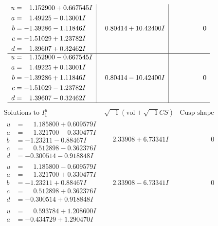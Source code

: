 \documentclass[1p]{elsarticle_modified}
\theoremstyle{definition}
\newcommand{\I}{\sqrt{-1}}
\begin{document}
$$\begin{array}{c|c|c}
\begin{aligned}
u &= \phantom{-}1.152900 + 0.667545 I \\
a &= \phantom{-}1.49225 - 0.13001 I \\
b &= -1.39286 - 1.11846 I \\
c &= -1.51029 + 1.23782 I \\
d &= \phantom{-}1.39607 + 0.32462 I\end{aligned}
 & \phantom{-}0.80414 + 10.42400 I & \phantom{-0.000000 } 0 \\ \hline\begin{aligned}
u &= \phantom{-}1.152900 - 0.667545 I \\
a &= \phantom{-}1.49225 + 0.13001 I \\
b &= -1.39286 + 1.11846 I \\
c &= -1.51029 - 1.23782 I \\
d &= \phantom{-}1.39607 - 0.32462 I\end{aligned}
 & \phantom{-}0.80414 - 10.42400 I & \phantom{-0.000000 } 0\\
 \hline 
 \end{array}$$\newpage$$\begin{array}{c|c|c}  
\text{Solutions to }I^u_{1}& \I (\text{vol} + \sqrt{-1}CS) & \text{Cusp shape}\\
 \hline 
\begin{aligned}
u &= \phantom{-}1.185800 + 0.609579 I \\
a &= \phantom{-}1.321700 - 0.330477 I \\
b &= -1.23211 - 0.88467 I \\
c &= \phantom{-}0.512898 - 0.362376 I \\
d &= -0.300514 - 0.918848 I\end{aligned}
 & \phantom{-}2.33908 + 6.73341 I & \phantom{-0.000000 } 0 \\ \hline\begin{aligned}
u &= \phantom{-}1.185800 - 0.609579 I \\
a &= \phantom{-}1.321700 + 0.330477 I \\
b &= -1.23211 + 0.88467 I \\
c &= \phantom{-}0.512898 + 0.362376 I \\
d &= -0.300514 + 0.918848 I\end{aligned}
 & \phantom{-}2.33908 - 6.73341 I & \phantom{-0.000000 } 0 \\ \hline\begin{aligned}
u &= \phantom{-}0.593784 + 1.208600 I \\
a &= -0.434729 + 1.290470 I \\

\end{aligned}
\end{array}$$
\end{document}
